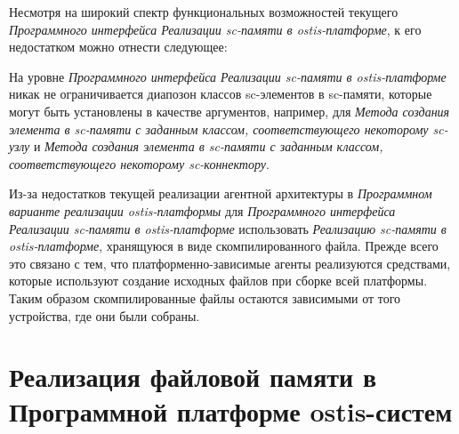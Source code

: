 Несмотря на широкий спектр функциональных возможностей текущего \textit{Программного интерфейса Реализации sc-памяти в ostis-платформе}, к его недостатком можно отнести следующее:
\begin{textitemize}
	\item На уровне \textit{Программного интерфейса Реализации sc-памяти в ostis-платформе} никак не ограничивается диапозон классов sc-элементов в sc-памяти, которые могут быть установлены в качестве аргументов, например, для \textit{Метода создания элемента в sc-памяти с заданным классом, соответствующего некоторому sc-узлу} и \textit{Метода создания элемента в sc-памяти с заданным классом, соответствующего некоторому sc-коннектору}.
	\item Из-за недостатков текущей реализации агентной архитектуры в \textit{Программном варианте реализации ostis-платформы}  для \textit{Программного интерфейса Реализации sc-памяти в ostis-платформе} использовать \textit{Реализацию sc-памяти в ostis-платформе}, хранящуюся в виде скомпилированного файла. Прежде всего это связано с тем, что платформенно-зависимые агенты реализуются средствами, которые используют создание исходных файлов при сборке всей платформы. Таким образом скомпилированные файлы остаются зависимыми от того устройства, где они были собраны.
\end{textitemize}

\section{Реализация файловой памяти в Программной платформе ostis-систем}
\label{sec_soft_platform_file_memory}

